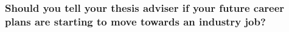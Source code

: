 \documentclass{beamer}
\begin{document}
\begin{frame}
  \frametitle{ Should you tell your thesis adviser if your future career plans are starting to move towards an industry job?}
  










\end{frame}
\end{document}
